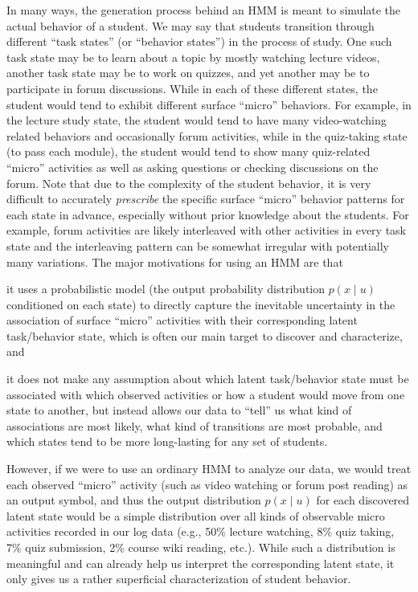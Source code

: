 In many ways, the generation process behind an HMM is meant to simulate the
actual behavior of a student. We may say that students transition through
different ``task states'' (or ``behavior states'')  in the process of
study.  One such task state may be to learn about a topic by mostly
watching lecture videos, another task state may be to work on quizzes, and
yet another may be to participate in forum discussions. While in each of
these different states, the student would tend to exhibit different surface
``micro'' behaviors. For example, in the lecture study state, the student
would tend to have many video-watching related behaviors and occasionally
forum activities, while in the quiz-taking state (to pass each module), the
student would tend to show many quiz-related ``micro'' activities as well
as asking questions or checking discussions on the forum. Note that due to
the complexity of the student behavior, it is very difficult to accurately
\emph{prescribe} the specific surface ``micro'' behavior patterns for each
state in advance, especially without  prior knowledge about the students.
For example, forum activities are likely interleaved with other activities
in every task state and the interleaving pattern can be somewhat irregular
with potentially many variations. The major motivations for using an HMM
are that
\begin{enumerate*}[label=(\arabic*)]
  \item it uses a probabilistic model (the output probability distribution
    $p(x \mid u)$ conditioned on each state) to directly capture the
    inevitable uncertainty in the association of surface ``micro''
    activities with their corresponding latent task/behavior state, which
    is often our main target to discover and characterize, and
  \item it does not make any assumption about which latent task/behavior
    state must be associated with which observed activities or how a
    student would move from one state to another, but instead allows our
    data to ``tell'' us what kind of associations are most likely, what
    kind of transitions are most probable, and which states tend to be more
    long-lasting for any set of students.
\end{enumerate*}

However, if we were to use an ordinary HMM to analyze our data, we would
treat each observed ``micro'' activity (such as video watching or forum
post reading) as an output symbol, and thus the output distribution $p(x
\mid u)$ for each discovered latent state would be a simple distribution
over all kinds of observable micro activities recorded in our log data
(e.g., 50\% lecture watching, 8\% quiz taking, 7\% quiz submission, 2\%
course wiki reading, etc.). While such a distribution is meaningful and
can already help us interpret the corresponding latent state, it only gives
us a rather superficial characterization of student behavior.

